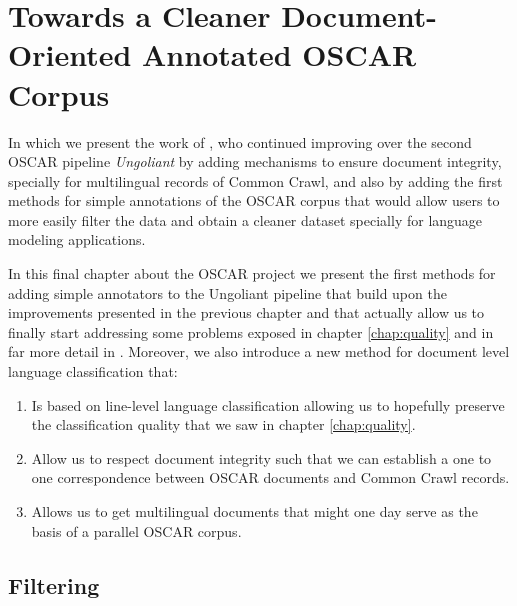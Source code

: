 \chapter{Towards a Cleaner Document-Oriented Annotated OSCAR Corpus}\label{chap:towards}

\begin{center}
    \begin{minipage}{0.66\textwidth}
        \begin{small}
            In which we present the work of \citet{abadji-etal-2022-towards}, who continued improving over the second OSCAR pipeline \emph{Ungoliant} by adding mechanisms to ensure document integrity, specially for multilingual records of Common Crawl, and also by adding the first methods for simple annotations of the OSCAR corpus that would allow users to more easily filter the data and obtain a cleaner dataset specially for language modeling applications.
        \end{small}
    \end{minipage}
    \vspace{0.5cm}
\end{center}

In this final chapter about the OSCAR project we present the first methods for adding simple annotators to the Ungoliant pipeline that build upon the improvements presented in the previous chapter and that actually allow us to finally start addressing some problems exposed in chapter \ref{chap:quality} and in far more detail in \citep{caswell-etal-2020-language,kreutzer-etal-2021-quality}. Moreover, we also introduce a new method for document level language classification that:

\begin{enumerate}
    \item Is based on line-level language classification allowing us to hopefully preserve the classification quality that we saw in chapter \ref{chap:quality}.
    \item Allow us to respect document integrity such that we can establish a one to one correspondence between OSCAR documents and Common Crawl records.
    \item Allows us to get multilingual documents that might one day serve as the basis of a parallel OSCAR corpus.
\end{enumerate}

\section{Filtering}

